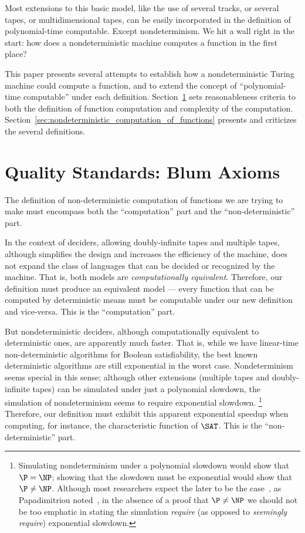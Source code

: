 \documentclass[12pt]{article}
\theoremstyle{definition}
\begin{document}
Most extensions to this basic model,
like the use of several tracks, or several tapes, or multidimensional tapes,
can be easily incorporated in the definition of polynomial-time computable.
Except nondeterminism.
We hit a wall right in the start:
how does a nondeterministic machine computes a function in the first place?

This paper presents several attempts to establish
how a nondeterministic Turing machine could compute a function,
and to extend the concept of ``polynomial-time computable'' under each definition.
Section~\ref{sec:quality-standards} sets reasonableness criteria
to both the definition of function computation and complexity of the computation.
Section~\ref{sec:nondeterministic_computation_of_functions}
presents and criticizes the several definitions.

\section{Quality Standards: Blum Axioms}
\label{sec:quality-standards}

The definition of non-deterministic computation of functions we are trying to make
must encompass both the ``computation'' part
and the ``non-deterministic'' part.

In the context of deciders,
allowing doubly-infinite tapes and multiple tapes,
although simplifies the design and increases the efficiency of the machine,
does not expand the class of languages that can be decided or recognized by the machine.
That is, both models are \emph{computationally equivalent}.
Therefore,
our definition must produce an equivalent model
--- every function that can be computed by deterministic means
must be computable under our new definition and vice-versa.
This is the ``computation'' part.

But nondeterministic deciders,
although computationally equivalent to deterministic ones,
are apparently much faster.
That is, while we have linear-time non-deterministic algorithms for Boolean satisfiability,
the best known deterministic algorithms are still exponential in the worst case.
Nondeterminism seems special in this sense;
although other extensions (multiple tapes and doubly-infinite tapes)
can be simulated under just a polynomial slowdown,
the simulation of nondeterminism seems to require exponential slowdown.%
\footnote{
    Simulating nondeterminism under a polynomial slowdown would show that $\P = \NP$;
    showing that the slowdown must be exponential would show that $\P \neq \NP$.
    Although most researchers expect the later to be the case~\cite[p.~54]{Gasarch2012},
    as Papadimitriou noted~\cite[p.~412]{Papadimitriou1994},
    in the absence of a proof that $\P \neq \NP$
    we should not be too emphatic in stating the simulation \emph{require}
    (as opposed to \emph{seemingly require}) exponential slowdown.
}
Therefore,
our definition must exhibit this apparent exponential speedup
when computing, for instance, the characteristic function of $\SAT$.
This is the ``non-deterministic'' part.
\end{document}
